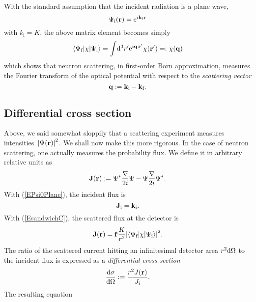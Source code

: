 With the standard assumption
that the incident radiation is a plane wave,
\begin{equation}\label{EPsi0Plane}
  \Psi_\text{i}(\mathbf{r})={\rm e}^{i \mathbf{k}_\text{i} \mathbf{r}}
\end{equation}
with $k_\text{i}=K$,
the above matrix element becomes simply
\begin{equation}\label{EBornQ}
  \langle \Psi_\text{f}|\chi|\Psi_\text{i}\rangle
  = \int\!{\rm d}^3r' {\rm e}^{i\mathbf{q}\,\mathbf{r}'}\chi(\mathbf{r}')
  =: \chi(\mathbf{q})
\end{equation}
which shows that neutron scattering,
in first-order Born approximation,
measures the Fourier transform
of the optical potential
with respect to the \textit{scattering vector}
\begin{equation}
  \mathbf{q}:=\mathbf{k}_\text{i}-\mathbf{k}_\text{f}.
\end{equation}


\subsection{Differential cross section}

Above, we said somewhat sloppily
that a scattering experiment measures intensities~${|\Psi(\mathbf{r})|}^2$.
We shall now make this more rigorous.
In the case of neutron scattering,
one actually measures the probability flux.
We define it in arbitrary relative units as
\begin{equation}
  \mathbf{J}(\mathbf{r}) := \Psi^*\frac{\mathbf{\nabla}}{2i}\Psi - \Psi\frac{\mathbf{\nabla}}{2i}\Psi^*.
\end{equation}
With (\ref{EPsi0Plane}), the incident flux is
\begin{equation}
  \mathbf{J}_\text{i} = \mathbf{k}_\text{i}.
\end{equation}
With (\ref{EsandwichC}), the scattered flux at the detector is
\begin{equation}\label{EJr}
  \mathbf{J}(\mathbf{r})
  = \mathbf{\hat r}\frac{K}{r^2}
    {\left|\langle\Psi_\text{f}|\chi|\Psi_\text{i}\rangle\right|}^2.
\end{equation}
The ratio of the scattered current hitting an infinitesimal detector area
$r^2{\rm d}\Omega$ to the incident flux is expressed as a
\textit{differential cross section}
\begin{equation}
  \frac{{\rm d}\sigma}{{\rm d}\Omega}
  := \frac{r^2 J(\mathbf{r})}{J_\text{i}}.
\end{equation}
The resulting equation

